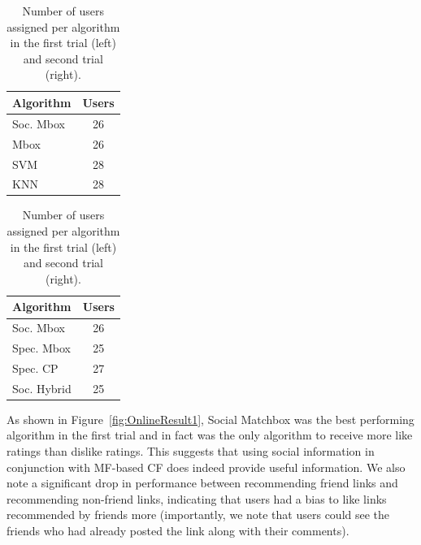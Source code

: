 \begin{table}[t!]
\centering
\begin{minipage}{1.5in}
\begin{tabular}{| l | c |}
\hline
{\bf Algorithm} & {\bf Users} \\
\hline
Soc. Mbox & 26\\
Mbox  & 26 \\
SVM & 28 \\
KNN & 28 \\
\hline
\end{tabular}
  \end{minipage}
  \begin{minipage}{1.3in}
\begin{tabular}{| l | c |}
\hline
{\bf Algorithm} & {\bf Users} \\
\hline
Soc. Mbox & 26\\
Spec. Mbox  & 25 \\
Spec. CP & 27 \\
Soc. Hybrid & 25 \\
\hline
\end{tabular}
  \end{minipage}
\caption{Number of users assigned per algorithm in the first trial (left)
and second trial (right).}
\label{tab:Assigned1}
\end{table}

As shown in Figure~\ref{fig:OnlineResult1}, Social Matchbox was the
best performing algorithm in the first trial and in fact was the only
algorithm to receive more like ratings than dislike ratings. 
This suggests that using social information in conjunction with
MF-based CF does indeed provide useful information.  We also note a
significant drop in performance between recommending friend links and
recommending non-friend links, indicating that users had a bias to
like links recommended by friends more (importantly, we note that
users could see the friends who had already posted the link along with
their comments).

